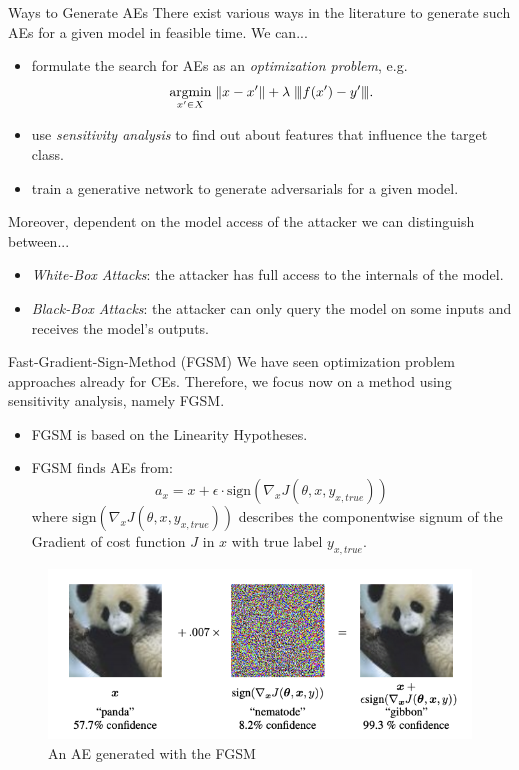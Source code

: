 \documentclass[11pt,compress,t,notes=noshow, xcolor=table]{beamer}
\begin{document}
\begin{vbframe}{Ways to Generate AEs}
There exist various ways in the literature to generate such AEs for a given model in feasible time. We can...
\begin{itemize}
    \item formulate the search for AEs as an \emph{optimization problem}, e.g. 
    \begin{equation*}
        \label{eq:optimization}
        \underset{x'\in X}{\text{argmin}}\; \| x-x' \|+\lambda\;    {\left\vert\kern-0.25ex\left\vert\kern-0.25ex\left\vert f(x')-y' \right\vert\kern-0.25ex\right\vert\kern-0.25ex\right\vert}.
    \end{equation*}
    \item use \emph{sensitivity analysis} to find out about features that influence the target class.
    \item train a generative network to generate adversarials for a given model.
\end{itemize}
Moreover, dependent on the model access of the attacker we can distinguish between...
\begin{itemize}
    \item \emph{White-Box Attacks}: the attacker has full access to the internals of the model.
    \item \emph{Black-Box Attacks}: the attacker can only query the model on some inputs and receives the model's outputs.
\end{itemize}
\end{vbframe}

\begin{vbframe}{Fast-Gradient-Sign-Method (FGSM)}
We have seen optimization problem approaches already for CEs. Therefore, we focus now on a method using sensitivity analysis, namely FGSM.
\begin{itemize}
    \item FGSM is based on the Linearity Hypotheses.
    \item FGSM finds AEs from:
    \begin{equation*}
        a_x=x+\epsilon\cdot\text{sign}(\nabla_x J(\theta,x,y_{x,true}))
    \end{equation*}
    where $\text{sign}(\nabla_x J(\theta,x,y_{x,true}))$ describes the componentwise signum of the Gradient of cost function $J$ in $x$ with true label $y_{x,true}$.
\end{itemize}
\begin{figure}[h]
\centering
\includegraphics[width=0.45\linewidth]{slides/local-explanations/figure/AEpanda.png}
  \caption{An AE generated with the FGSM}
  \label{fig:mnist}
\end{figure} 
\end{vbframe}
\end{document}
